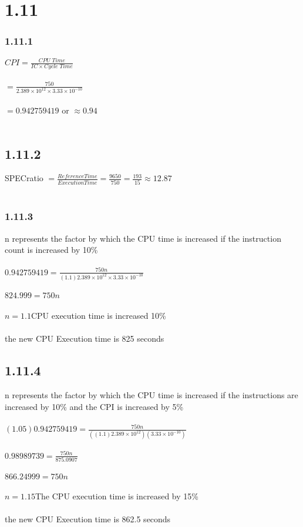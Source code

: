 \documentclass[12pt,letterpaper]{article}
\begin{document}
\section*{1.11}
\subsubsection*{1.11.1}
$CPI = \frac{CPU\;Time}{IC \times Cycle\;Time}$\\\\
\indent$= \frac{750}{2.389\times 10^{12} \times 3.33\times10^{-10}}$\\\\
\indent$= 0.942759419$ \indent or \indent $\approx0.94$\\\\
\subsection*{1.11.2}
SPECratio $= \frac{Reference Time}{Execution Time} = \frac{9650}{750} = \frac{193}{15} \approx 12.87$\\\\
\subsubsection*{1.11.3}
n represents the factor by which the CPU time is increased if the instruction count is increased by 10\%\\\\
$0.942759419 = \frac{750n}{(1.1)2.389\times10^{12}\times 3.33\times10^{-10}}$\\\\
$824.999=750n$\\\\
$n=1.1$\indent CPU execution time is increased 10\%\\\\
\indent the new CPU Execution time is 825 seconds
\subsection*{1.11.4}
n represents the factor by which the CPU time is increased if the instructions are increased by 10\% and the CPI is increased by 5\%\\\\
$(1.05)0.942759419=\frac{750n}{((1.1)2.389\times10^{12})(3.33\times10^{-10})}$\\\\
$0.98989739 = \frac{750n}{875.0907}$\\\\
$866.24999 = 750n$\\\\
$n = 1.15$\indent The CPU execution time is increased by 15\%\\\\
\indent the new CPU Execution time is 862.5 seconds
\end{document}
